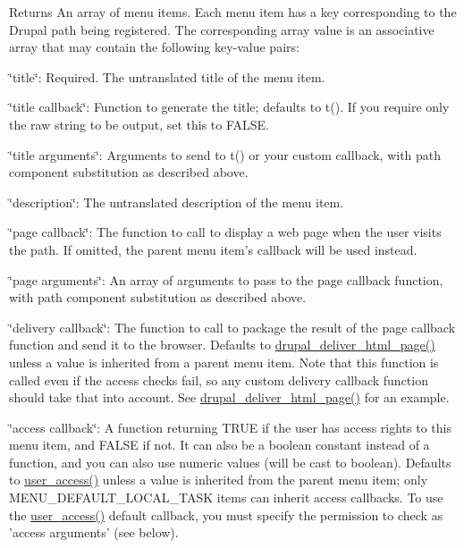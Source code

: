 \begin{DoxyReturn}{Returns}
An array of menu items. Each menu item has a key corresponding to the Drupal path being registered. The corresponding array value is an associative array that may contain the following key-\/value pairs:
\begin{DoxyItemize}
\item \char`\"{}title\char`\"{}: Required. The untranslated title of the menu item.
\item \char`\"{}title callback\char`\"{}: Function to generate the title; defaults to t(). If you require only the raw string to be output, set this to FALSE.
\item \char`\"{}title arguments\char`\"{}: Arguments to send to t() or your custom callback, with path component substitution as described above.
\item \char`\"{}description\char`\"{}: The untranslated description of the menu item.
\item \char`\"{}page callback\char`\"{}: The function to call to display a web page when the user visits the path. If omitted, the parent menu item's callback will be used instead.
\item \char`\"{}page arguments\char`\"{}: An array of arguments to pass to the page callback function, with path component substitution as described above.
\item \char`\"{}delivery callback\char`\"{}: The function to call to package the result of the page callback function and send it to the browser. Defaults to \hyperlink{common_8inc_a05ab0d6e81d6cbe2a6b9f645b9e710ec}{drupal\_\-deliver\_\-html\_\-page()} unless a value is inherited from a parent menu item. Note that this function is called even if the access checks fail, so any custom delivery callback function should take that into account. See \hyperlink{common_8inc_a05ab0d6e81d6cbe2a6b9f645b9e710ec}{drupal\_\-deliver\_\-html\_\-page()} for an example.
\item \char`\"{}access callback\char`\"{}: A function returning TRUE if the user has access rights to this menu item, and FALSE if not. It can also be a boolean constant instead of a function, and you can also use numeric values (will be cast to boolean). Defaults to \hyperlink{user_8module_a8daa9d898b1e84225b519ee0c7fb57e0}{user\_\-access()} unless a value is inherited from the parent menu item; only MENU\_\-DEFAULT\_\-LOCAL\_\-TASK items can inherit access callbacks. To use the \hyperlink{user_8module_a8daa9d898b1e84225b519ee0c7fb57e0}{user\_\-access()} default callback, you must specify the permission to check as 'access arguments' (see below).

\end{DoxyItemize}
\end{DoxyReturn}
